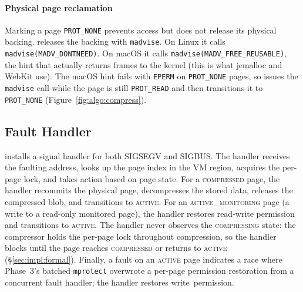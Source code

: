\paragraph{Physical page reclamation}
Marking a page \texttt{PROT\_NONE} prevents access but does not
release its physical backing.  \sys releases the backing with
\texttt{madvise}.  On Linux it calls
\texttt{madvise(MADV\_\allowbreak DONTNEED)}.
On macOS it calls
\texttt{madvise(MADV\_\allowbreak FREE\_\allowbreak REUSABLE)},
the hint that actually returns frames to the kernel (this is what
jemalloc and WebKit use).  The macOS hint fails with
\texttt{EPERM} on \texttt{PROT\_NONE} pages, so \sys issues the
\texttt{madvise} call while the page is still \texttt{PROT\_READ}
and then transitions it to \texttt{PROT\_NONE}
(Figure~\ref{fig:algo:compress}).

\subsection{Fault Handler}
\label{sec:impl:fault}

\sys installs a signal handler for both SIGSEGV and SIGBUS.  The
handler receives the faulting address, looks up the page index in the
VM region, acquires the per-page lock, and takes action based on page
state.  For a \textsc{compressed} page, the handler recommits the
physical page, decompresses the stored data, releases the compressed
blob, and transitions to \textsc{active}.  For an
\textsc{active\_monitoring} page (a write to a read-only monitored
page), the handler restores read-write permission and transitions to
\textsc{active}.  The handler never observes the \textsc{compressing}
state: the compressor holds the per-page lock throughout compression,
so the handler blocks until the page reaches \textsc{compressed} or
returns to \textsc{active} (\S\ref{sec:impl:formal}).  Finally, a fault on an \textsc{active} page
indicates a race where Phase~3's batched \texttt{mprotect} overwrote a
per-page permission restoration from a concurrent fault handler; the
handler restores write~permission.

